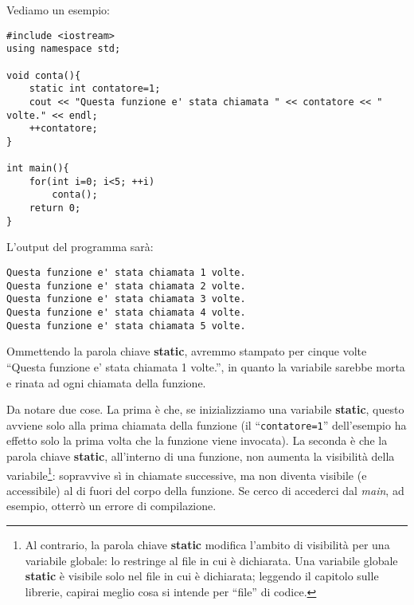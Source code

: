 \begin{subappendices}
Vediamo un esempio:
\begin{lstlisting}
#include <iostream>
using namespace std;

void conta(){
	static int contatore=1; 
	cout << "Questa funzione e' stata chiamata " << contatore << " volte." << endl;
	++contatore;
}

int main(){
	for(int i=0; i<5; ++i)
		conta();
	return 0;
}
\end{lstlisting}
L'output del programma sarà:
\begin{shaded}
\begin{verbatim}
Questa funzione e' stata chiamata 1 volte.
Questa funzione e' stata chiamata 2 volte.
Questa funzione e' stata chiamata 3 volte.
Questa funzione e' stata chiamata 4 volte.
Questa funzione e' stata chiamata 5 volte.
\end{verbatim}
\end{shaded}
Ommettendo la parola chiave \textbf{static}, avremmo stampato per cinque volte ``Questa funzione e' stata chiamata 1 volte.'', in quanto la variabile sarebbe morta e rinata ad ogni chiamata della funzione.

Da notare due cose. La prima è che, se inizializziamo una variabile \textbf{static}, questo avviene solo alla prima chiamata della funzione (il ``\verb|contatore=1|'' dell'esempio ha effetto solo la prima volta che la funzione viene invocata). La seconda è che la parola chiave \textbf{static}, all'interno di una funzione, non aumenta la visibilità della variabile\footnote{Al contrario, la parola chiave \textbf{static} modifica l'ambito di visibilità per una variabile globale: lo restringe al file in cui è dichiarata. Una variabile globale \textbf{static} è visibile solo nel file in cui è dichiarata; leggendo il capitolo sulle librerie, capirai meglio cosa si intende per ``file'' di codice.}: sopravvive sì in chiamate successive, ma non diventa visibile (e accessibile) al di fuori del corpo della funzione. Se cerco di accederci dal \emph{main}, ad esempio, otterrò un errore di compilazione.
\end{subappendices}